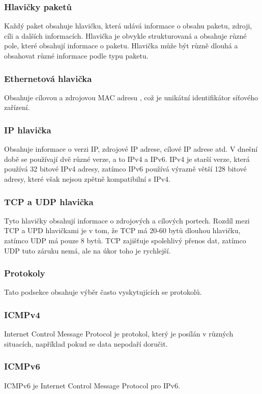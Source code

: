 \documentclass[a4paper, 11pt, hidelinks]{article}
\begin{document}
\subsubsection{Hlavičky paketů}
Každý paket obsahuje hlavičku, která udává informace o obsahu paketu, zdroji, cíli a dalších informacích. Hlavička je obvykle strukturovaná a obsahuje různé pole, které obsahují informace o paketu. Hlavička může být různě dlouhá a obsahovat různé informace podle typu paketu.

\subsubsection{Ethernetová hlavička}
Obsahuje cílovou a zdrojovou MAC adresu \cite{ethernet_header}, což je unikátní identifikátor síťového zařízení.

\subsubsection{IP hlavička}
Obsahuje informace o verzi IP, zdrojové IP adrese, cílové IP adrese atd. V dnešní době se používají dvě různé verze, a to IPv4 a IPv6. IPv4 je starší verze, která používá 32 bitové IPv4 adresy, zatímco IPv6 používá výrazně větší 128 bitové adresy, které však nejsou zpětně kompatibilní s IPv4. \cite{IP_header}

\subsubsection{TCP a UDP hlavička}
Tyto hlavičky obsahují informace o zdrojových a cílových portech. Rozdíl mezi TCP a UPD hlavičkami je v tom, že TCP má 20-60 bytů dlouhou hlavičku, zatímco UDP má pouze 8 bytů. TCP zajišťuje spolehlivý přenos dat, zatímco UDP tuto záruku nemá, ale na úkor toho je rychlejší. \cite{TCP_UDP_Header}

\subsubsection{Protokoly}
Tato podsekce obsahuje výběr často vyskytujících se protokolů.

\subsubsection{ICMPv4}
Internet Control Message Protocol je protokol, který je posílán v různých situacích, například pokud se data nepodaří doručit. \cite{RFC792}

\subsubsection{ICMPv6}
ICMPv6 je Internet Control Message Protocol pro IPv6. \cite{RFC4443}
\end{document}
